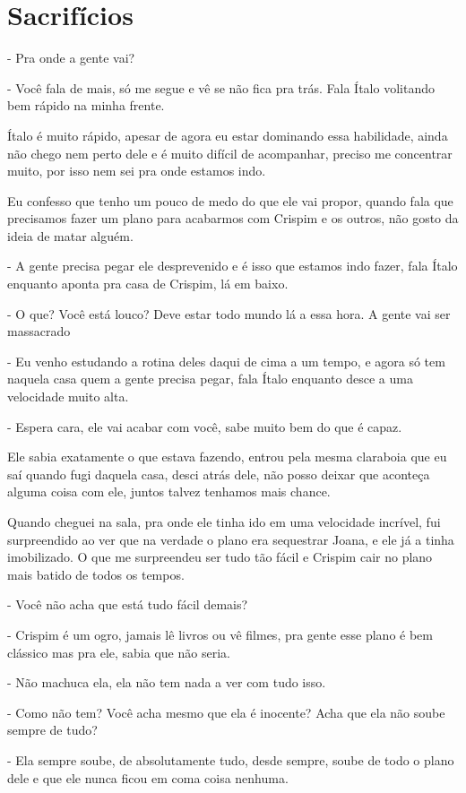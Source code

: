\chapter{Sacrifícios}
- Pra onde a gente vai?

- Você fala de mais, só me segue e vê se não fica pra trás. Fala Ítalo volitando bem rápido na minha frente.

Ítalo é muito rápido, apesar de agora eu estar dominando essa habilidade, ainda não chego nem perto dele e é muito difícil de acompanhar, preciso me concentrar muito, por isso nem sei pra onde estamos indo.

Eu confesso que tenho um pouco de medo do que ele vai propor, quando fala que precisamos fazer um plano para acabarmos com Crispim e os outros, não gosto da ideia de matar alguém.

- A gente precisa pegar ele desprevenido e é isso que estamos indo fazer, fala Ítalo enquanto aponta pra casa de Crispim, lá em baixo.

- O que? Você está louco? Deve estar todo mundo lá a essa hora. A gente vai ser massacrado

- Eu venho estudando a rotina deles daqui de cima a um tempo, e agora só tem naquela casa quem a gente precisa pegar, fala Ítalo enquanto desce a uma velocidade muito alta.

- Espera cara, ele vai acabar com você, sabe muito bem do que é capaz.

Ele sabia exatamente o que estava fazendo, entrou pela mesma claraboia que eu saí quando fugi daquela casa, desci atrás dele, não posso deixar que aconteça alguma coisa com ele, juntos talvez tenhamos mais chance.

Quando cheguei na sala, pra onde ele tinha ido em uma velocidade incrível, fui surpreendido ao ver que na verdade o plano era sequestrar Joana, e ele já a tinha imobilizado. O que me surpreendeu ser tudo tão fácil e Crispim cair no plano mais batido de todos os tempos.

- Você não acha que está tudo fácil demais?

- Crispim é um ogro, jamais lê livros ou vê filmes, pra gente esse plano é bem clássico mas pra ele, sabia que não seria.

- Não machuca ela, ela não tem nada a ver com tudo isso.

- Como não tem? Você acha mesmo que ela é inocente? Acha que ela não soube sempre de tudo?

- Ela sempre soube, de absolutamente tudo, desde sempre, soube de todo o plano dele e que ele nunca ficou em coma coisa nenhuma.


